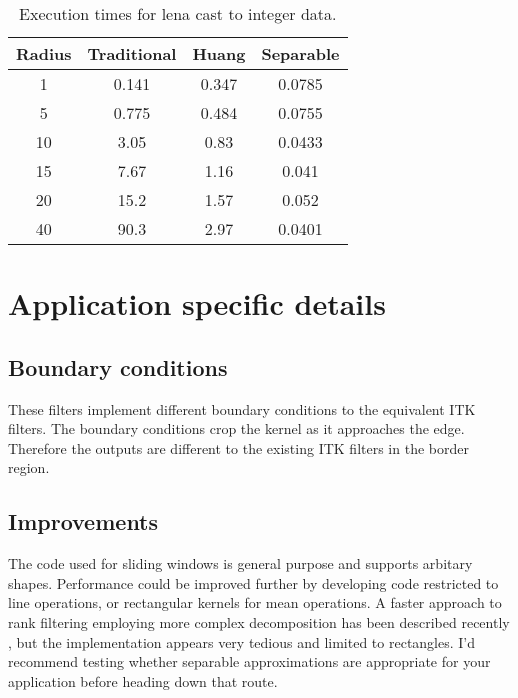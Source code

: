 \documentclass{InsightArticle}
\begin{document}
\begin{table}[htbp]
\centering
\begin{tabular}{|c|c|c|c|}
\hline
Radius & Traditional & Huang & Separable \\
\hline
\hline
1    &   0.141 &  0.347 &  0.0785 \\
5    &   0.775 &  0.484 &  0.0755 \\
10   &   3.05  &  0.83  &  0.0433 \\
15   &   7.67  &  1.16  &  0.041 \\
20   &   15.2  &  1.57  &  0.052 \\
40   &   90.3  &  2.97  &  0.0401 \\
\hline
\end{tabular}
\caption{Execution times for lena cast to integer data. \label{tbl:perfInt}}
\end{table}
\section{Application specific details}
\subsection{Boundary conditions}
These filters implement different boundary conditions to the
equivalent ITK filters. The boundary conditions crop the kernel as it
approaches the edge. Therefore the outputs are different to the
existing ITK filters in the border region.

\subsection{Improvements}
The code used for sliding windows is general purpose and supports
arbitary shapes. Performance could be improved further by developing
code restricted to line operations, or rectangular kernels for mean
operations. A faster approach to rank filtering employing more complex
decomposition has been described recently \cite{Weiss}, but the
implementation appears very tedious and limited to rectangles. I'd
recommend testing whether separable approximations are appropriate for
your application before heading down that route.

\appendix





\nocite{ITKSoftwareGuide}
\end{document}
